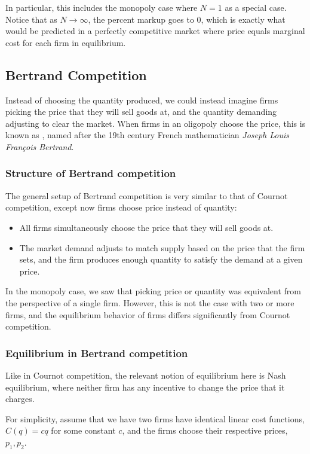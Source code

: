 In particular, this includes the monopoly case where $N = 1$ as a special case. Notice that as $N \to \infty$, the percent markup goes to 0, which is exactly what would be predicted in a perfectly competitive market where price equals marginal cost for each firm in equilibrium.

\subsection{Bertrand Competition}
Instead of choosing the quantity produced, we could instead imagine firms picking the price that they will sell goods at, and the quantity demanding adjusting to clear the market. When firms in an oligopoly choose the price, this is known as , named after the 19th century French mathematician \emph{Joseph Louis François Bertrand}. 

\subsubsection*{Structure of Bertrand competition}
The general setup of Bertrand competition is very similar to that of Cournot competition, except now firms choose price instead of quantity:
\begin{itemize}
    \item All firms simultaneously choose the price that they will sell goods at.
    \item The market demand adjusts to match supply based on the price that the firm sets, and the firm produces enough quantity to satisfy the demand at a given price.
\end{itemize}

In the monopoly case, we saw that picking price or quantity was equivalent from the perspective of a single firm. However, this is not the case with two or more firms, and the equilibrium behavior of firms differs significantly from Cournot competition.

\subsubsection*{Equilibrium in Bertrand competition}
Like in Cournot competition, the relevant notion of equilibrium here is Nash equilibrium, where neither firm has any incentive to change the price that it charges.

For simplicity, assume that we have two firms have identical linear cost functions, $C(q) = cq$ for some constant $c$, and the firms choose their respective prices, $p_1, p_2$. 


